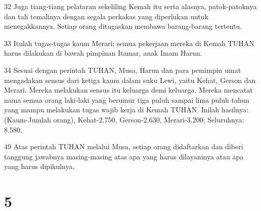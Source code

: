 \par 32 Juga tiang-tiang pelataran sekeliling Kemah itu serta alasnya, patok-patoknya dan tali temalinya dengan segala perkakas yang diperlukan untuk menegakkannya. Setiap orang ditugaskan membawa barang-barang tertentu.
\par 33 Itulah tugas-tugas kaum Merari; semua pekerjaan mereka di Kemah TUHAN harus dilakukan di bawah pimpinan Itamar, anak Imam Harun.
\par 34 Sesuai dengan perintah TUHAN, Musa, Harun dan para pemimpin umat mengadakan sensus dari ketiga kaum dalam suku Lewi, yaitu Kehat, Gerson dan Merari. Mereka melakukan sensus itu keluarga demi keluarga. Mereka mencatat nama semua orang laki-laki yang berumur tiga puluh sampai lima puluh tahun yang mampu melakukan tugas wajib kerja di Kemah TUHAN. Inilah hasilnya: (Kaum-Jumlah orang), Kehat-2.750, Gerson-2.630, Merari-3.200; Seluruhnya: 8.580.
\par 49 Atas perintah TUHAN melalui Musa, setiap orang didaftarkan dan diberi tanggung jawabnya masing-masing atas apa yang harus dilayaninya atau apa yang harus dipikulnya.

\chapter{5}

